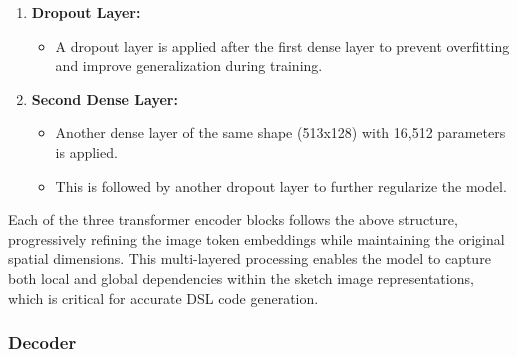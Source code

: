 \begin{enumerate}[label=\textbf{\roman*})]
\begin{enumerate}
        \item \textbf{Dropout Layer:}
        \begin{itemize}
            \item A dropout layer is applied after the first dense layer to prevent overfitting and improve generalization during training.
        \end{itemize}
        
        \item \textbf{Second Dense Layer:}
        \begin{itemize}
            \item Another dense layer of the same shape (513x128) with 16,512 parameters is applied.
            \item This is followed by another dropout layer to further regularize the model.
        \end{itemize}
    \end{enumerate}
\end{enumerate}Each of the three transformer encoder blocks follows the above structure, progressively refining the image token embeddings while maintaining the original spatial dimensions. This multi-layered processing enables the model to capture both local and global dependencies within the sketch image representations, which is critical for accurate DSL code generation.



\subsubsection{Decoder}

